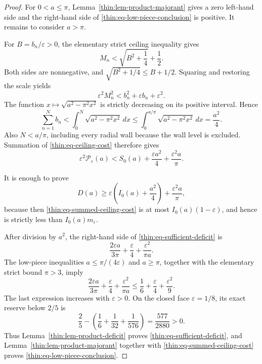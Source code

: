 \documentclass[11pt]{article}
\numberwithin{equation}{section}
\theoremstyle{definition}
\theoremstyle{remark}
\begin{document}
\begin{proof}
For \(0<a\leq\pi\), Lemma~\ref{thin:lem-product-majorant} gives a zero
left-hand side and the right-hand side of
\eqref{thin:eq-low-piece-conclusion} is positive.  It remains to consider
\(a>\pi\).

For \(B=b_n/\varepsilon>0\), the elementary strict ceiling inequality gives
\[
  M_n<\sqrt{B^2+\frac14}+\frac12.
\]
Both sides are nonnegative, and
\(\sqrt{B^2+1/4}\leq B+1/2\).  Squaring and restoring the scale yields
\begin{equation}
  \varepsilon^2M_n^2
  <b_n^2+\varepsilon b_n+\varepsilon^2.
  \label{thin:eq-ceiling-cost}
\end{equation}
The function \(x\mapsto\sqrt{a^2-\pi^2x^2}\) is strictly decreasing on
its positive interval.  Hence
\begin{equation}
  \sum_{n=1}^{N}b_n
  <\int_0^N\sqrt{a^2-\pi^2x^2}\,dx
  \leq\int_0^{a/\pi}\sqrt{a^2-\pi^2x^2}\,dx
  =\frac{a^2}{4}.
  \label{thin:eq-quarter-disc}
\end{equation}
Also \(N<a/\pi\), including every radial wall because the wall level is
excluded.  Summation of \eqref{thin:eq-ceiling-cost} therefore gives
\begin{equation}
  \varepsilon^2\mathcal P_\varepsilon(a)
  <S_0(a)+\frac{\varepsilon a^2}{4}
    +\frac{\varepsilon^2a}{\pi}.
  \label{thin:eq-summed-ceiling-cost}
\end{equation}

It is enough to prove
\begin{equation}
  D(a)\geq
  \varepsilon\left(I_0(a)+\frac{a^2}{4}\right)
  +\frac{\varepsilon^2a}{\pi},
  \label{thin:eq-sufficient-deficit}
\end{equation}
because then \eqref{thin:eq-summed-ceiling-cost} is at most
\(I_0(a)(1-\varepsilon)\), and hence is strictly less than
\(I_0(a)m_\varepsilon\).

After division by \(a^2\), the right-hand side of
\eqref{thin:eq-sufficient-deficit} is
\[
  \frac{2\varepsilon a}{3\pi}+\frac\varepsilon4
  +\frac{\varepsilon^2}{\pi a}.
\]
The low-piece inequalities \(a\leq\pi/(4\varepsilon)\) and \(a\geq\pi\),
together with the elementary strict bound \(\pi>3\), imply
\begin{equation}
  \frac{2\varepsilon a}{3\pi}+\frac\varepsilon4
  +\frac{\varepsilon^2}{\pi a}
  \leq \frac16+\frac\varepsilon4+\frac{\varepsilon^2}{9}.
  \label{thin:eq-low-cost-screen}
\end{equation}
The last expression increases with \(\varepsilon>0\).  On the closed face
\(\varepsilon=1/8\), its exact reserve below \(2/5\) is
\begin{equation}
  \frac25-\left(\frac16+\frac1{32}+\frac1{576}\right)
  =\frac{577}{2880}>0.
  \label{thin:eq-low-reserve}
\end{equation}
Thus Lemma~\ref{thin:lem-product-deficit} proves
\eqref{thin:eq-sufficient-deficit}, and
Lemma~\ref{thin:lem-product-majorant} together with
\eqref{thin:eq-summed-ceiling-cost} proves
\eqref{thin:eq-low-piece-conclusion}.


\end{proof}
\end{document}
